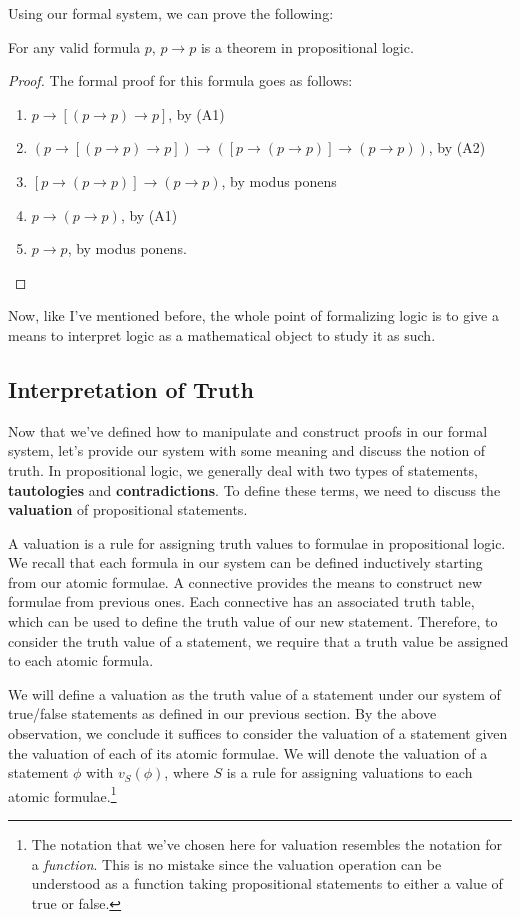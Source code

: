 Using our formal system, we can prove the following:

\begin{thm}
	For any valid formula $p$, $p\to p$ is a theorem in propositional logic.
\end{thm}
\begin{proof}
	The formal proof for this formula goes as follows:
	\begin{enumerate}
		\item $p \to [(p \to p) \to p]$, by (A1)
		\item $(p \to [ (p \to p) \to p]) \to ([p \to (p \to p)] \to (p \to p))$, by (A2)
		\item $[p \to (p \to p)] \to (p \to p)$, by modus ponens
		\item $p \to (p \to p)$, by (A1)
		\item $p \to p$, by modus ponens.
	\end{enumerate}
\end{proof}

Now, like I've mentioned before, the whole point of formalizing logic is to give a means to interpret logic as a mathematical object to study it as such.

\subsection{Interpretation of Truth}
Now that we've defined how to manipulate and construct proofs in our formal system, let's provide our system with some meaning and discuss the notion of truth.
In propositional logic, we generally deal with two types of statements, \textbf{tautologies} and \textbf{contradictions}.
To define these terms, we need to discuss the \textbf{valuation} of propositional statements.

A valuation is a rule for assigning truth values to formulae in propositional logic.
We recall that each formula in our system can be defined inductively starting from our atomic formulae.
A connective provides the means to construct new formulae from previous ones.
Each connective has an associated truth table, which can be used to define the truth value of our new statement.
Therefore, to consider the truth value of a statement, we require that a truth value be assigned to each atomic formula.

We will define a valuation as the truth value of a statement under our system of true/false statements as defined in our previous section.
By the above observation, we conclude it suffices to consider the valuation of a statement given the valuation of each of its atomic formulae.
We will denote the valuation of a statement $\phi$ with $v_S(\phi)$, where $S$ is a rule for assigning valuations to each atomic formulae.\footnote{
The notation that we've chosen here for valuation resembles the notation for a \textit{function}.
This is no mistake since the valuation operation can be understood as a function taking propositional statements to either a value of true or false.}

